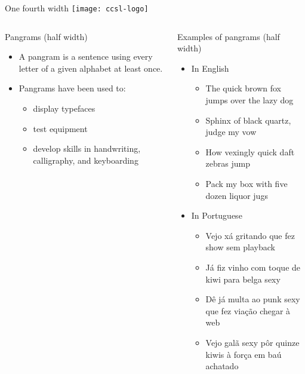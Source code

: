 \documentclass[
  xcolor={hyperref,svgnames,x11names,table},
  hyperref={pdfencoding=unicode,plainpages=false,pdfpagelabels=true,breaklinks=true},
  brazilian,english,
]{beamer}
\newcommand\halfcol{\column{.46\textwidth}}
\newcommand\onefourthcol{\column{.2084\textwidth}}
\begin{document}
\begin{frame}[fragile]
\begin{columns}[T]
  \onefourthcol

  \begin{block}{One fourth width}
    \centering
    \vspace{.5\baselineskip}
    \texttt{[image: ccsl-logo]}
    \vspace{.5\baselineskip}
  \end{block}

\end{columns}

\vspace{.5\baselineskip}

\begin{columns}[T]

  \halfcol

  \begin{block}{Pangrams (half width)}
    \begin{itemize}
      \item A \alert{pangram} is a sentence using every letter of a given
            alphabet at least once.
      \item Pangrams have been used to:
      \begin{itemize}
        \item display typefaces
        \item test equipment
        \item develop skills in handwriting, calligraphy, and keyboarding
      \end{itemize}
    \end{itemize}
  \end{block}

  \begin{block}{Examples of pangrams (half width)}
    \begin{itemize}
      \item In English
      \begin{itemize}
        \item The quick brown fox jumps over the lazy dog
        \item Sphinx of black quartz, judge my vow
        \item How vexingly quick daft zebras jump
        \item Pack my box with five dozen liquor jugs
      \end{itemize}
      \item In Portuguese
      \begin{itemize}
        \item Vejo xá gritando que fez show sem playback
        \item Já fiz vinho com toque de kiwi para belga sexy
        \item Dê já multa ao punk sexy que fez viação chegar à web
        \item Vejo galã sexy pôr quinze kiwis à força em baú achatado
      \end{itemize}
    \end{itemize}
  \end{block}


\end{columns}
\end{frame}
\end{document}
